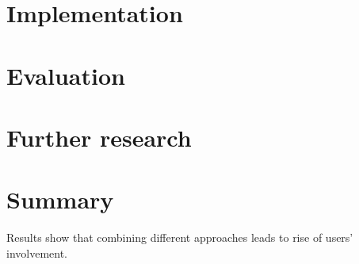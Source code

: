 \documentclass{article}
\begin{document}
    \section{Implementation}
    \label{sec:implementation}

    \section{Evaluation}
    \label{sec:evaluation}

    \section{Further research}
    \label{sec:further}

    \section{Summary}
    \label{sec:summary}

        Results show that combining different approaches leads to rise of users' involvement.

        

    
      
\end{document}

